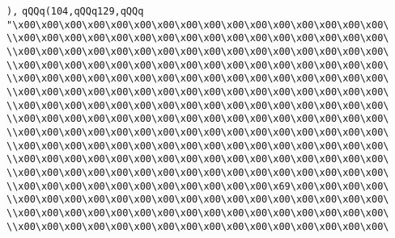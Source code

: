 \verb|),|\newline
\verb|qQQq(104,qQQq129,qQQq|\newline
\verb|"\x00\x00\x00\x00\x00\x00\x00\x00\x00\x00\x00\x00\x00\x00\x00\x00\|\newline
\verb|\\x00\x00\x00\x00\x00\x00\x00\x00\x00\x00\x00\x00\x00\x00\x00\x00\|\newline
\verb|\\x00\x00\x00\x00\x00\x00\x00\x00\x00\x00\x00\x00\x00\x00\x00\x00\|\newline
\verb|\\x00\x00\x00\x00\x00\x00\x00\x00\x00\x00\x00\x00\x00\x00\x00\x00\|\newline
\verb|\\x00\x00\x00\x00\x00\x00\x00\x00\x00\x00\x00\x00\x00\x00\x00\x00\|\newline
\verb|\\x00\x00\x00\x00\x00\x00\x00\x00\x00\x00\x00\x00\x00\x00\x00\x00\|\newline
\verb|\\x00\x00\x00\x00\x00\x00\x00\x00\x00\x00\x00\x00\x00\x00\x00\x00\|\newline
\verb|\\x00\x00\x00\x00\x00\x00\x00\x00\x00\x00\x00\x00\x00\x00\x00\x00\|\newline
\verb|\\x00\x00\x00\x00\x00\x00\x00\x00\x00\x00\x00\x00\x00\x00\x00\x00\|\newline
\verb|\\x00\x00\x00\x00\x00\x00\x00\x00\x00\x00\x00\x00\x00\x00\x00\x00\|\newline
\verb|\\x00\x00\x00\x00\x00\x00\x00\x00\x00\x00\x00\x00\x00\x00\x00\x00\|\newline
\verb|\\x00\x00\x00\x00\x00\x00\x00\x00\x00\x00\x00\x00\x00\x00\x00\x00\|\newline
\verb|\\x00\x00\x00\x00\x00\x00\x00\x00\x00\x00\x00\x69\x00\x00\x00\x00\|\newline
\verb|\\x00\x00\x00\x00\x00\x00\x00\x00\x00\x00\x00\x00\x00\x00\x00\x00\|\newline
\verb|\\x00\x00\x00\x00\x00\x00\x00\x00\x00\x00\x00\x00\x00\x00\x00\x00\|\newline
\verb|\\x00\x00\x00\x00\x00\x00\x00\x00\x00\x00\x00\x00\x00\x00\x00\x00\|\newline

